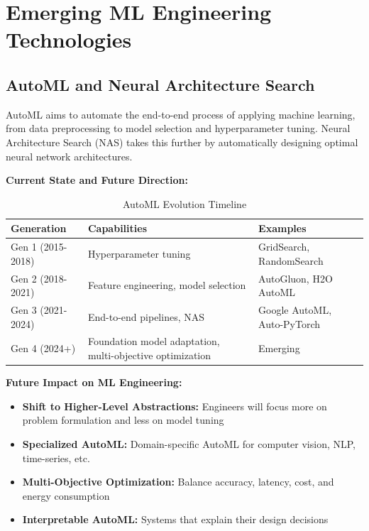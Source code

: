 \section{Emerging ML Engineering Technologies}

\subsection{AutoML and Neural Architecture Search}

AutoML aims to automate the end-to-end process of applying machine learning, from data preprocessing to model selection and hyperparameter tuning. Neural Architecture Search (NAS) takes this further by automatically designing optimal neural network architectures.

\textbf{Current State and Future Direction:}

\begin{table}[h]
\centering
\caption{AutoML Evolution Timeline}
\begin{tabular}{p{2.5cm}p{5cm}p{5cm}}
\toprule
\textbf{Generation} & \textbf{Capabilities} & \textbf{Examples} \\
\midrule
Gen 1 (2015-2018) & Hyperparameter tuning & GridSearch, RandomSearch \\
\midrule
Gen 2 (2018-2021) & Feature engineering, model selection & AutoGluon, H2O AutoML \\
\midrule
Gen 3 (2021-2024) & End-to-end pipelines, NAS & Google AutoML, Auto-PyTorch \\
\midrule
Gen 4 (2024+) & Foundation model adaptation, multi-objective optimization & Emerging \\
\bottomrule
\end{tabular}
\end{table}

\textbf{Future Impact on ML Engineering:}

\begin{itemize}
    \item \textbf{Shift to Higher-Level Abstractions:} Engineers will focus more on problem formulation and less on model tuning
    \item \textbf{Specialized AutoML:} Domain-specific AutoML for computer vision, NLP, time-series, etc.
    \item \textbf{Multi-Objective Optimization:} Balance accuracy, latency, cost, and energy consumption
    \item \textbf{Interpretable AutoML:} Systems that explain their design decisions
\end{itemize}

